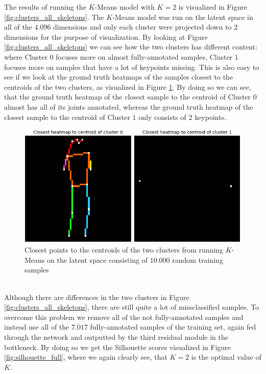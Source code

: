 \documentclass[./main.tex]{subfiles}
\begin{document}
The results of running the $K$-Means model with $K = 2$ is visualized in Figure \ref{fig:clusters_all_skeletons}. The $K$-Means model was run on the latent space in all of the $4.096$ dimensions and only each cluster were projected down to $2$ dimensions for the purpose of visualization. By looking at Figure \ref{fig:clusters_all_skeletons} we can see how the two clusters has different content: where Cluster $0$ focuses more on almost fully-annotated samples, Cluster $1$ focuses more on samples that have a lot of keypoints missing. This is also easy to see if we look at the ground truth heatmaps of the samples closest to the centroids of the two clusters, as visualized in Figure \ref{fig:centroids_all}. By doing so we can see, that the ground truth heatmap of the closest sample to the centroid of Cluster $0$ almost has all of its joints annotated, whereas the ground truth heatmap of the closest sample to the centroid of Cluster $1$ only consists of $2$ keypoints.
\\
\begin{figure}[htbp]
    \centering
    \includegraphics[height = 4 cm]{entities/centroids_all_skeletons.png}
    \caption{Closest points to the centroids of the two clusters from running $K$-Means on the latent space consisting of $10.000$ random training samples}
    \label{fig:centroids_all}
\end{figure}
\\
Although there are differences in the two clusters in Figure \ref{fig:clusters_all_skeletons}, there are still quite a lot of missclassified samples. To overcome this problem we remove all of the not fully-annotated samples and instead use all of the $7.017$ fully-annotated samples of the training set, again fed through the network and outputted by the third residual module in the bottleneck. By doing so we get the Silhouette scores visualized in Figure \ref{fig:silhouette_full}, where we again clearly see, that $K = 2$ is the optimal value of $K$.
\\
\\
\end{document}
